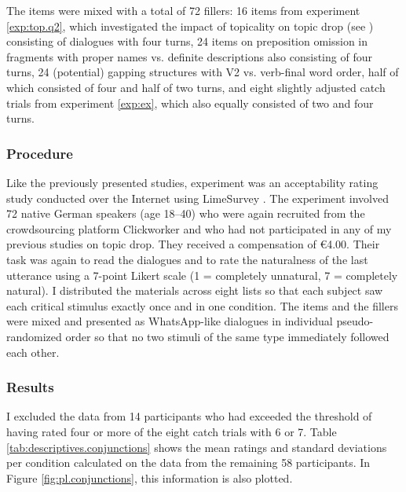The items were mixed with a total of 72 fillers:
16 items from experiment \ref*{exp:top.q2}, which investigated the impact of topicality on topic drop (see ) consisting of dialogues with four turns, 24 items on preposition omission in fragments with proper names vs. definite descriptions also consisting of four turns, 24 (potential) gapping structures with V2 vs. verb-final word order, half of which consisted of four and half of two turns, and eight slightly adjusted catch trials from experiment \ref*{exp:ex}, which also equally consisted of two and four turns.

\subsubsection{Procedure}\label{sec:ex.conj.prod}
Like the previously presented studies, experiment  was an acceptability rating study conducted over the Internet using LimeSurvey \citep{limesurveygmbh}.
The experiment involved 72 native German speakers (age 18--40) who were again recruited from the crowdsourcing platform Clickworker \citep{clickworker2022} and who had not participated in any of my previous studies on topic drop.
They received a compensation of €4.00. 
Their task was again to read the dialogues and to rate the naturalness of the last utterance using a 7-point Likert scale (1 = completely unnatural, 7 = completely natural).
I distributed the materials across eight lists so that each subject saw each critical stimulus exactly once and in one condition.
The items and the fillers were mixed and presented as WhatsApp-like dialogues in individual pseudo-randomized order so that no two stimuli of the same type immediately followed each other.

\subsubsection{Results}\label{sec:ex.conj.res}
I excluded the data from 14 participants who had exceeded the threshold of having rated four or more of the eight catch trials with 6 or 7.
Table \ref{tab:descriptives.conjunctions} shows the mean ratings and standard deviations per condition calculated on the data from the remaining 58 participants.
In Figure \ref{fig:pl.conjunctions}, this information is also plotted.

